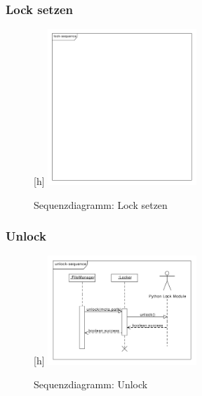 \subsubsection{Lock setzen}
\begin{figure}[h]
	\centering
	\label{design:dia:sqc:lock}[h]
	\includegraphics[width=0.5\textwidth]{design/frontend/sequence/lock-sequence.pdf}
	\caption{Sequenzdiagramm: Lock setzen}
\end{figure}

\subsubsection{Unlock}
\begin{figure}[h]
	\centering
	\label{design:dia:sqc:unlock}[h]
	\includegraphics[width=0.5\textwidth]{design/frontend/sequence/unlock-sequence.pdf}
	\caption{Sequenzdiagramm: Unlock}
\end{figure}

